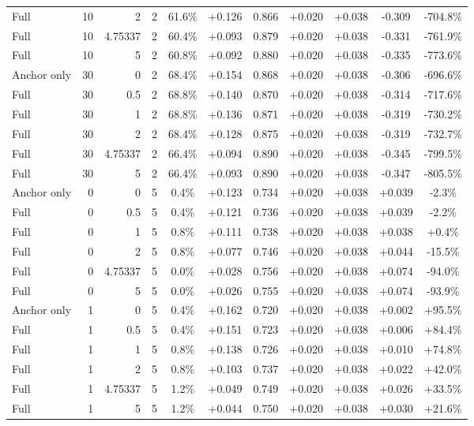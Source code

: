 \begin{table}[htbp]
\begin{tabular}{lrrrccccccc}
Full & 10 & 2 & 2 & 61.6\% & +0.126 & 0.866 & +0.020 & +0.038 & -0.309 & -704.8\% \\
Full & 10 & 4.75337 & 2 & 60.4\% & +0.093 & 0.879 & +0.020 & +0.038 & -0.331 & -761.9\% \\
Full & 10 & 5 & 2 & 60.8\% & +0.092 & 0.880 & +0.020 & +0.038 & -0.335 & -773.6\% \\
Anchor only & 30 & 0 & 2 & 68.4\% & +0.154 & 0.868 & +0.020 & +0.038 & -0.306 & -696.6\% \\
Full & 30 & 0.5 & 2 & 68.8\% & +0.140 & 0.870 & +0.020 & +0.038 & -0.314 & -717.6\% \\
Full & 30 & 1 & 2 & 68.8\% & +0.136 & 0.871 & +0.020 & +0.038 & -0.319 & -730.2\% \\
Full & 30 & 2 & 2 & 68.4\% & +0.128 & 0.875 & +0.020 & +0.038 & -0.319 & -732.7\% \\
Full & 30 & 4.75337 & 2 & 66.4\% & +0.094 & 0.890 & +0.020 & +0.038 & -0.345 & -799.5\% \\
Full & 30 & 5 & 2 & 66.4\% & +0.093 & 0.890 & +0.020 & +0.038 & -0.347 & -805.5\% \\
Anchor only & 0 & 0 & 5 & 0.4\% & +0.123 & 0.734 & +0.020 & +0.038 & +0.039 & -2.3\% \\
Full & 0 & 0.5 & 5 & 0.4\% & +0.121 & 0.736 & +0.020 & +0.038 & +0.039 & -2.2\% \\
Full & 0 & 1 & 5 & 0.8\% & +0.111 & 0.738 & +0.020 & +0.038 & +0.038 & +0.4\% \\
Full & 0 & 2 & 5 & 0.8\% & +0.077 & 0.746 & +0.020 & +0.038 & +0.044 & -15.5\% \\
Full & 0 & 4.75337 & 5 & 0.0\% & +0.028 & 0.756 & +0.020 & +0.038 & +0.074 & -94.0\% \\
Full & 0 & 5 & 5 & 0.0\% & +0.026 & 0.755 & +0.020 & +0.038 & +0.074 & -93.9\% \\
Anchor only & 1 & 0 & 5 & 0.4\% & +0.162 & 0.720 & +0.020 & +0.038 & +0.002 & +95.5\% \\
Full & 1 & 0.5 & 5 & 0.4\% & +0.151 & 0.723 & +0.020 & +0.038 & +0.006 & +84.4\% \\
Full & 1 & 1 & 5 & 0.8\% & +0.138 & 0.726 & +0.020 & +0.038 & +0.010 & +74.8\% \\
Full & 1 & 2 & 5 & 0.8\% & +0.103 & 0.737 & +0.020 & +0.038 & +0.022 & +42.0\% \\
Full & 1 & 4.75337 & 5 & 1.2\% & +0.049 & 0.749 & +0.020 & +0.038 & +0.026 & +33.5\% \\
Full & 1 & 5 & 5 & 1.2\% & +0.044 & 0.750 & +0.020 & +0.038 & +0.030 & +21.6\% \\

\end{tabular}
\end{table}
